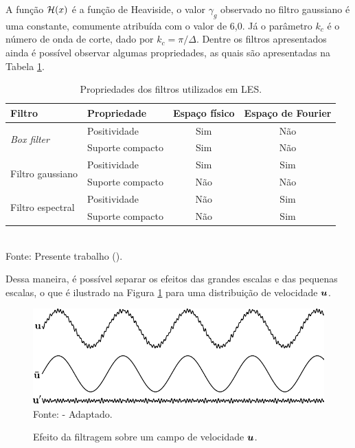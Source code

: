A função $\mathcal{H}(x)$ é a função de Heaviside, o valor $\gamma_g$ observado no filtro gaussiano é uma constante, comumente atribuída com o valor de 6,0. Já o parâmetro $k_c$ é o número de onda de corte, dado por $k_c=\pi/\Delta$. Dentre os filtros apresentados ainda é possível observar algumas propriedades, as quais são apresentadas na Tabela \ref{tab:filters2}.

\begin{table}[h!]
    \centering
    \caption{Propriedades dos filtros utilizados em LES.}
    \begin{tabular}{llcc}
        \hline
        Filtro                               & Propriedade      & Espaço físico & Espaço de Fourier \\\hline
        \multirow{2}{*}{\textit{Box filter}} & Positividade     & Sim           & Não               \\
                                             & Suporte compacto & Sim           & Não               \\\hline
        \multirow{2}{*}{Filtro gaussiano}    & Positividade     & Sim           & Sim               \\
                                             & Suporte compacto & Não           & Não               \\\hline
        \multirow{2}{*}{Filtro espectral}    & Positividade     & Não           & Sim               \\
                                             & Suporte compacto & Não           & Sim               \\\hline
    \end{tabular}
    \\Fonte: Presente trabalho (\the\year).
    \label{tab:filters2}
\end{table}


Dessa maneira, é possível separar os efeitos das grandes escalas e das pequenas escalas, o que é ilustrado na Figura \ref{fig:EfeitoFiltragem} para uma distribuição de velocidade $\boldsymbol{u}$.

\begin{figure}[h!]
    \centering
    \caption{Efeito da filtragem sobre um campo de velocidade $\boldsymbol{u}$.}
    \includegraphics[width=.75\linewidth]{Figuras/efeito_filtragem.pdf}
    \\Fonte:  - Adaptado.
    \label{fig:EfeitoFiltragem}
\end{figure}

